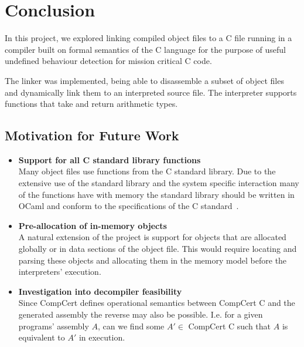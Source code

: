 \chapter{Conclusion}\label{conclusion}

In this project, we explored linking compiled object files to a C file running in a compiler built on formal semantics of the C language for the purpose of useful undefined behaviour detection for mission critical C code.

The linker was implemented, being able to disassemble a subset of object files and dynamically link them to an interpreted source file. The interpreter supports functions that take and return arithmetic types.

\section{Motivation for Future Work}

\begin{itemize}
    \item \textbf{Support for all C standard library functions}\\
    Many object files use functions from the C standard library. Due to the extensive use of the standard library and the system specific interaction many of the functions have with memory the standard library should be written in OCaml and conform to the specifications of the C standard~\cite{iso_standard}.
    
    \item \textbf{Pre-allocation of in-memory objects}\\
    A natural extension of the project is support for objects that are allocated globally or in data sections of the object file. This would require locating and parsing these objects and allocating them in the memory model before the interpreters' execution.
    
    \item \textbf{Investigation into decompiler feasibility}\\
    Since CompCert defines operational semantics between CompCert C and the generated assembly the reverse may also be possible. I.e. for a given programs' assembly $A$, can we find some $A' \in$ CompCert C such that $A$ is equivalent to $A'$ in execution. 
\end{itemize}
